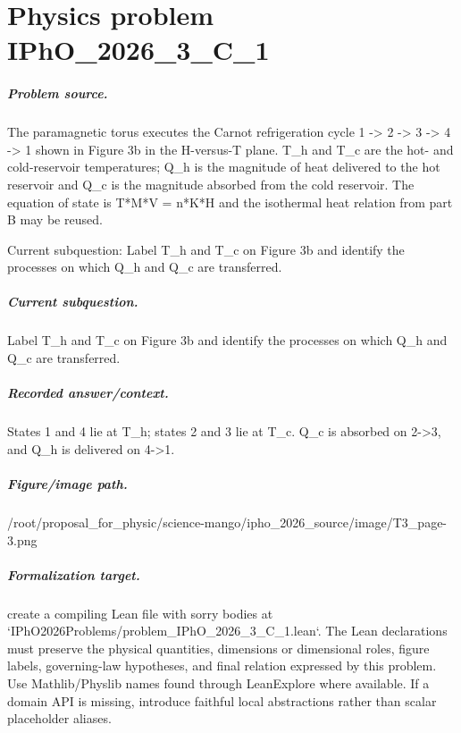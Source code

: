 
\chapter{Physics problem IPhO\_2026\_3\_C\_1}
\label{ch:IPhO2026Problems_problem_IPhO_2026_3_C_1}

\paragraph{Problem source.}
The paramagnetic torus executes the Carnot refrigeration cycle 1 -> 2 -> 3 -> 4 -> 1 shown in Figure 3b in the H-versus-T plane. T\_h and T\_c are the hot- and cold-reservoir temperatures; Q\_h is the magnitude of heat delivered to the hot reservoir and Q\_c is the magnitude absorbed from the cold reservoir. The equation of state is T*M*V = n*K*H and the isothermal heat relation from part B may be reused.

Current subquestion:
Label T\_h and T\_c on Figure 3b and identify the processes on which Q\_h and Q\_c are transferred.

\paragraph{Current subquestion.}
Label T\_h and T\_c on Figure 3b and identify the processes on which Q\_h and Q\_c are transferred.

\paragraph{Recorded answer/context.}
States 1 and 4 lie at T\_h; states 2 and 3 lie at T\_c. Q\_c is absorbed on 2->3, and Q\_h is delivered on 4->1.

\paragraph{Figure/image path.}
/root/proposal\_for\_physic/science-mango/ipho\_2026\_source/image/T3\_page-3.png

\paragraph{Formalization target.}
create a compiling Lean file with sorry bodies at `IPhO2026Problems/problem\_IPhO\_2026\_3\_C\_1.lean`.
The Lean declarations must preserve the physical quantities, dimensions or dimensional roles, figure labels, governing-law hypotheses, and final relation expressed by this problem.
Use Mathlib/Physlib names found through LeanExplore where available. If a domain API is missing, introduce faithful local abstractions rather than scalar placeholder aliases.

